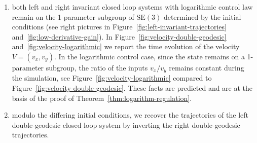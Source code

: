 \documentclass[11pt]{article}
\newcommand{\SE}{\mathrm{SE}}
\begin{document}
\begin{enumerate}[resume]
\item both left and right invariant closed loop systems with logarithmic control law remain on the 1-parameter subgroup of $\SE(3)$ determined by the initial conditions (see right pictures in Figure~\ref{fig:left-invariant-trajectories} and~\ref{fig:low-derivative-gain}). In Figure~\ref{fig:velocity-double-geodesic} and~\ref{fig:velocity-logarithmic} we report the time evolution of the velocity $V=(v_x,v_y)$. In the logarithmic control case, since the state remains on a 1-parameter subgroup, the ratio of the inputs $v_x/v_y$ remains constant during the simulation, see Figure~\ref{fig:velocity-logarithmic} compared to Figure~\ref{fig:velocity-double-geodesic}. These facts are predicted and are at the basis of the proof of Theorem~\ref{thm:logarithm-regulation}.
\item modulo the differing initial conditions, we recover the trajectories of the left double-geodesic closed loop system by inverting the right double-geodesic trajectories.
\end{enumerate}
\end{document}
